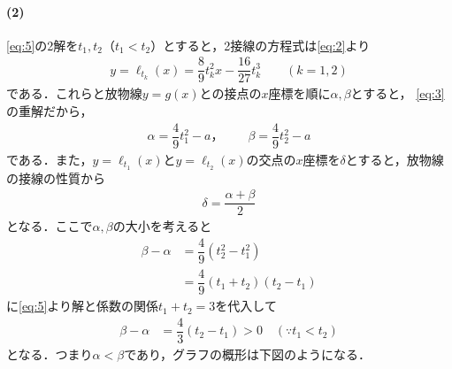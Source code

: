 \documentclass[../../main.tex]{subfiles}
\begin{document}
\paragraph{(2)}

\cref{eq:5}の2解を$t_1,t_2$（$t_1<t_2$）とすると，2接線の方程式は\cref{eq:2}より
\begin{align}
  y=\ell_{t_k}(x)=\dfrac{8}{9}t_k^2x-\dfrac{16}{27}t_k^3
  \qquad(k=1,2) \label{eq:7}
\end{align}
である．これらと放物線$y=g(x)$との接点の$x$座標を順に$\alpha,\beta$とすると，
\cref{eq:3}の重解だから，
\begin{align}
  \alpha=\dfrac{4}{9}t_1^2-a，\qquad
  \beta=\dfrac{4}{9}t_2^2-a \label{eq:8}
\end{align}
である．また，$y=\ell_{t_1}(x)$と$y=\ell_{t_2}(x)$の交点の$x$座標を$\delta$とすると，放物線の接線の性質から
\begin{align}
  \delta=\dfrac{\alpha+\beta}{2} \label{eq:9}
\end{align}
となる．ここで$\alpha, \beta$の大小を考えると
\begin{align}
  \beta - \alpha
  &= \dfrac{4}{9}\left(t_2^2-t_1^2\right) \\
  &= \dfrac{4}{9}(t_1+t_2)(t_2-t_1)
\end{align}
に\cref{eq:5}より解と係数の関係$t_1+t_2=3$を代入して
\begin{align}
  \beta - \alpha
  &= \dfrac{4}{3}(t_2-t_1) >0 \quad (\because t_1<t_2)
\end{align}
となる．つまり$\alpha<\beta$であり，グラフの概形は下図のようになる．
\end{document}
